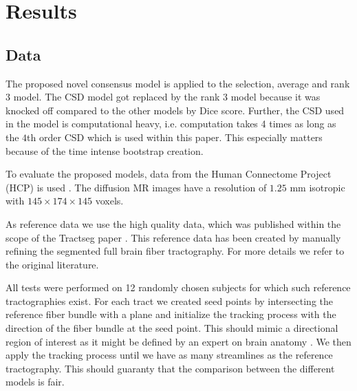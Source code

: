 \section{Results}
\label{sec:results}
\subsection{Data}
The proposed novel consensus model is applied to the selection,
average and rank $3$ model. The CSD model got replaced by the rank $3$ model
because it was knocked off compared to the other models by Dice score. Further,
the CSD used in the model is computational heavy, i.e. computation takes 4 times as long
as the $4$th order CSD which is used within this paper. This especially matters
because of the time intense bootstrap creation. 

To evaluate the proposed models, data from the Human
Connectome Project (HCP) is used \cite{HCP}. The diffusion MR images have a resolution of $1.25$ mm
isotropic with $145 \times 174 \times 145$ voxels. 

As reference data we use the high quality data, which was published within the
scope of the Tractseg paper \cite{WASSERTHAL2018239}. This reference data has been
created by manually refining the segmented full brain fiber tractography. For
more details we refer to the original literature.

All tests were performed on 12 randomly chosen subjects for which such reference tractographies
exist. For each tract we created seed points by intersecting the reference
fiber bundle with a plane and initialize the tracking process with the direction
of the fiber bundle at the seed point. This should mimic a directional region of
interest as it might be defined by an expert on brain anatomy
\cite{Graumann2016}. We then apply the tracking process until we have as many
streamlines as the reference tractography. This should guaranty that the
comparison between the different models is fair.

